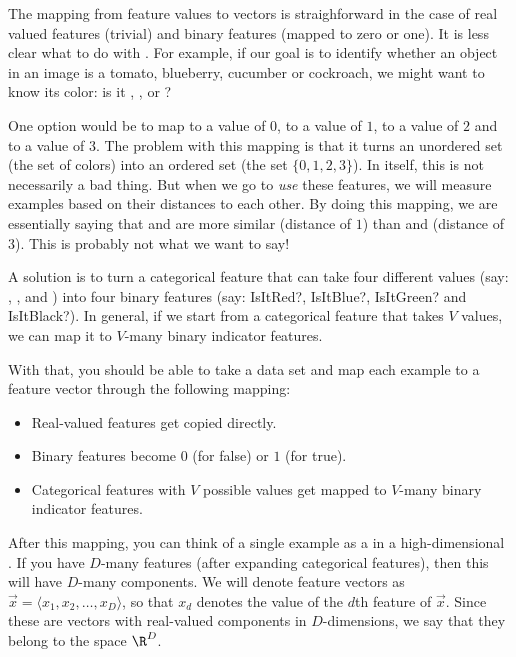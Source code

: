 
The mapping from feature values to vectors is straighforward in the
case of real valued features (trivial) and binary features (mapped to
zero or one).  It is less clear what to do with . For example, if our goal is to identify whether an object
in an image is a tomato, blueberry, cucumber or cockroach, we might
want to know its color: is it , , 
or ?

One option would be to map  to a value of $0$, 
to a value of $1$,  to a value of $2$ and 
to a value of $3$.  The problem with this mapping is that it turns an
unordered set (the set of colors) into an ordered set (the set
$\{0,1,2,3\}$).  In itself, this is not necessarily a bad thing.  But
when we go to \emph{use} these features, we will measure examples
based on their distances to each other.  By doing this mapping, we are
essentially saying that  and  are more similar
(distance of $1$) than  and  (distance of
$3$).  This is probably not what we want to say!

A solution is to turn a categorical feature that can take four
different values (say: , ,  and
) into four binary features (say: IsItRed?, IsItBlue?,
IsItGreen? and IsItBlack?).  In general, if we start from a
categorical feature that takes $V$ values, we can map it to $V$-many
binary indicator features.


With that, you should be able to take a data set and map each example
to a feature vector through the following mapping:

\begin{itemize}
\item Real-valued features get copied directly.
\item Binary features become $0$ (for false) or $1$ (for true).
\item Categorical features with $V$ possible values get mapped to
  $V$-many binary indicator features.
\end{itemize}

After this mapping, you can think of a single example as a
 in a high-dimensional .  If
you have $D$-many features (after expanding categorical features),
then this  will have $D$-many components.  We
will denote feature vectors as $\vec x = \langle x_1, x_2, \dots, x_D
\rangle$, so that $x_d$ denotes the value of the $d$th feature of
$\vec x$.  Since these are vectors with real-valued components in
$D$-dimensions, we say that they belong to the space $\R^D$.


